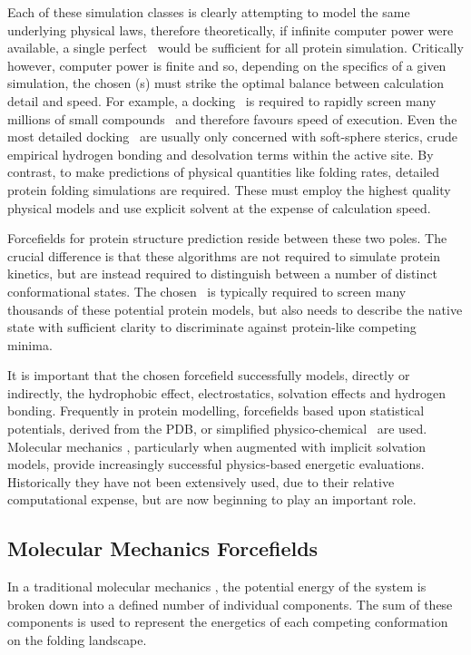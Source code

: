 Each of these simulation classes is clearly attempting to model the same underlying
physical laws, therefore theoretically, if infinite computer power were available, a single perfect \forcefield\ would be sufficient for all protein simulation. Critically however, computer power is finite and so, depending on the specifics of a given simulation, the chosen \forcefield(s) must strike the optimal balance between calculation detail and speed. For example, a docking
\forcefield\ is required to rapidly screen many millions of small compounds \insilico\ and therefore favours speed of execution. Even the most detailed docking \forcefields\ are usually only concerned with soft-sphere sterics, crude empirical hydrogen bonding and  desolvation terms within the active
site. By contrast, to make predictions of physical quantities like   folding rates, detailed protein folding simulations  are required. These  must employ the highest quality physical models and use  explicit solvent at the expense of calculation speed. 

Forcefields for protein structure prediction reside between these two poles.
The crucial difference is that these algorithms are not required to simulate
protein kinetics, but are instead required to distinguish between a  number of distinct
conformational states. The chosen \forcefield\ is typically required to screen many thousands of these potential protein models, but also needs to describe the native state with sufficient clarity to discriminate against protein-like competing minima.



It is important that the chosen forcefield successfully models, directly or indirectly, the hydrophobic effect, electrostatics, solvation effects and hydrogen bonding.
 Frequently in protein modelling, forcefields based upon statistical potentials, derived from the PDB, or simplified physico-chemical \forcefields\ are used. Molecular mechanics \forcefields,  particularly when augmented with implicit solvation models, provide increasingly successful physics-based energetic evaluations. Historically they have not been extensively used, due to their relative computational expense, but are now beginning to play an  important role.

\subsection{Molecular Mechanics Forcefields}

In a traditional molecular mechanics \forcefield, the potential energy of the system is broken down into a defined number of individual components. The sum of
these components is  used to represent the energetics of each competing conformation on the folding landscape. 

